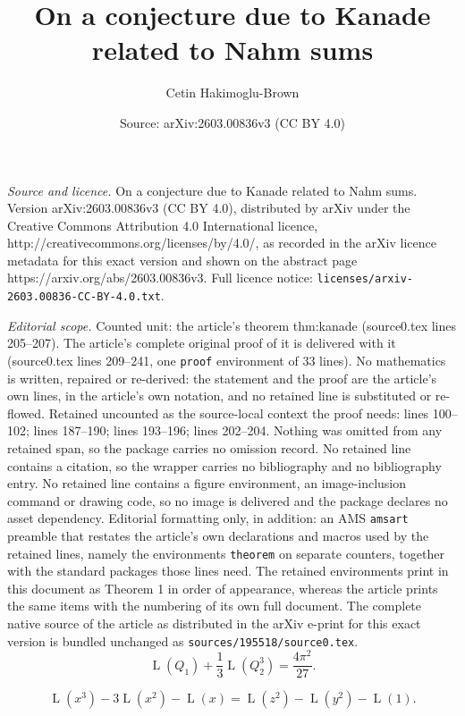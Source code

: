 \documentclass[10pt,a4paper]{amsart}
\title{On a conjecture due to Kanade related to Nahm sums}
\author{Cetin Hakimoglu-Brown}
\date{Source: arXiv:2603.00836v3 (CC BY 4.0)}
\newcommand{\Lr}{\operatorname{L}}
\begin{document}
\maketitle

\noindent\emph{Source and licence.} On a conjecture due to Kanade related to Nahm sums. Version arXiv:2603.00836v3 (CC BY 4.0), distributed by arXiv under the Creative Commons Attribution 4.0 International licence, http://creativecommons.org/licenses/by/4.0/, as recorded in the arXiv licence metadata for this exact version and shown on the abstract page https://arxiv.org/abs/2603.00836v3. Full licence notice: \texttt{licenses/arxiv-2603.00836-CC-BY-4.0.txt}.\par\smallskip

\noindent\textit{Editorial scope.} Counted unit: the article's theorem thm:kanade (source0.tex lines 205--207). The article's complete original proof of it is delivered with it (source0.tex lines 209--241, one \texttt{proof} environment of 33 lines). No mathematics is written, repaired or re-derived: the statement and the proof are the article's own lines, in the article's own notation, and no retained line is substituted or re-flowed.  Retained uncounted as the source-local context the proof needs: lines 100--102; lines 187--190; lines 193--196; lines 202--204.  Nothing was omitted from any retained span, so the package carries no omission record.  No retained line contains a citation, so the wrapper carries no bibliography and no bibliography entry.  No retained line contains a figure environment, an image-inclusion command or drawing code, so no image is delivered and the package declares no asset dependency.  Editorial formatting only, in addition: an AMS \texttt{amsart} preamble that restates the article's own declarations and macros used by the retained lines, namely the environments \texttt{theorem} on separate counters, together with the standard packages those lines need.  The retained environments print in this document as Theorem 1 in order of appearance, whereas the article prints the same items with the numbering of its own full document.  The complete native source of the article as distributed in the arXiv e-print for this exact version is bundled unchanged as \texttt{sources/195518/source0.tex}.
\begin{equation}\label{eq:kanade}
\Lr(Q_1)+\frac13\Lr(Q_2^3)=\frac{4\pi^2}{27}.
\end{equation}

\begin{equation}\label{eq:reduced1}
\Lr(x^3)-3\Lr(x^2)-\Lr(x)
=\Lr(z^2)-\Lr(y^2)-\Lr(1).
\end{equation}
\end{document}
